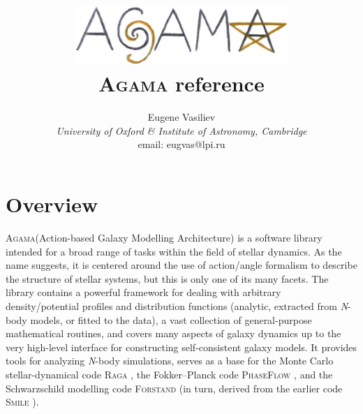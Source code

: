 \documentclass[12pt]{article}
\newcommand{\Agama}{\textsc{Agama}\xspace}
\newcommand{\Nbody}{\textsl{N}-body\xspace}
\begin{document}
\title{\vspace*{-14mm}
\includegraphics[width=8cm]{agama.jpg}\protect\\[5mm]\Agama reference}
\author{Eugene Vasiliev\\
\normalsize\textit{University of Oxford \& Institute of Astronomy, Cambridge}\\
\normalsize\textrm{email: eugvas@lpi.ru} }

\maketitle
\vspace*{-10mm}
\tableofcontents
\newpage

\section{Overview}

\Agama (Action-based Galaxy Modelling Architecture) is a software library intended for a broad range of tasks within the field of stellar dynamics. As the name suggests, it is centered around the use of action/angle formalism to describe the structure of stellar systems, but this is only one of its many facets. The library contains a powerful framework for dealing with arbitrary density/potential profiles and distribution functions (analytic, extracted from \Nbody models, or fitted to the data), a vast collection of general-purpose mathematical routines, and covers many aspects of galaxy dynamics up to the very high-level interface for constructing self-consistent galaxy models. It provides tools for analyzing \Nbody simulations, serves as a base for the Monte Carlo stellar-dynamical code \textsc{Raga} \cite{Vasiliev2015}, the Fokker--Planck code \textsc{PhaseFlow} \cite{Vasiliev2017}, and the Schwarzschild modelling code \textsc{Forstand} \cite{VasilievValluri2020} (in turn, derived from the earlier code \textsc{Smile} \cite{Vasiliev2013,VasilievAthanassoula2015}).
\end{document}
